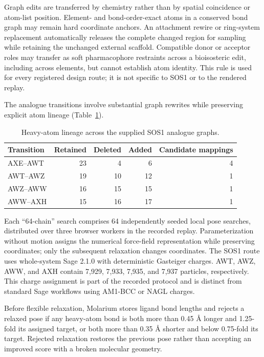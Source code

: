 \documentclass[11pt]{article}
\begin{document}
\begin{small}
Graph edits are transferred by chemistry rather than by spatial coincidence or atom-list position. Element- and bond-order-exact atoms in a conserved bond graph may remain hard coordinate anchors. An attachment rewire or ring-system replacement automatically releases the complete changed region for sampling while retaining the unchanged external scaffold. Compatible donor or acceptor roles may transfer as soft pharmacophore restraints across a bioisosteric edit, including across elements, but cannot establish atom identity. This rule is used for every registered design route; it is not specific to SOS1 or to the rendered replay.

The analogue transitions involve substantial graph rewrites while preserving explicit atom lineage (Table~\ref{tab:appA_lineage}).

\begin{table}[htbp]
\centering\small
\caption{Heavy-atom lineage across the supplied SOS1 analogue graphs.}
\label{tab:appA_lineage}
\begin{tabular}{@{}lrrrr@{}}
\toprule
\textbf{Transition} & \textbf{Retained} & \textbf{Deleted} & \textbf{Added} & \textbf{Candidate mappings}\\
\midrule
AXE--AWT & 23 & 4 & 6 & 4\\
AWT--AWZ & 19 & 10 & 12 & 1\\
AWZ--AWW & 16 & 15 & 15 & 1\\
AWW--AXH & 15 & 16 & 17 & 1\\
\bottomrule
\end{tabular}
\end{table}

Each ``64-chain'' search comprises 64 independently seeded local pose searches, distributed over three browser workers in the recorded replay. Parameterization without motion assigns the numerical force-field representation while preserving coordinates; only the subsequent relaxation changes coordinates. The SOS1 route uses whole-system Sage 2.1.0 with deterministic Gasteiger charges. AWT, AWZ, AWW, and AXH contain 7,929, 7,933, 7,935, and 7,937 particles, respectively. This charge assignment is part of the recorded protocol and is distinct from standard Sage workflows using AM1-BCC or NAGL charges.

Before flexible relaxation, Molarium stores ligand bond lengths and rejects a relaxed pose if any heavy-atom bond is both more than 0.45 \AA{} longer and 1.25-fold its assigned target, or both more than 0.35 \AA{} shorter and below 0.75-fold its target. Rejected relaxation restores the previous pose rather than accepting an improved score with a broken molecular geometry.


\end{small}
\end{document}
